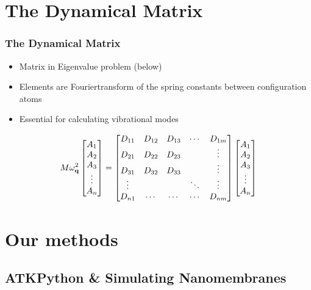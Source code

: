 \documentclass[hyperref={colorlinks=true,urlcolor=blue,linkcolor=.},aspectratio=1610,mathserif]{beamer}
\begin{document}
\section{The Dynamical Matrix}

\begin{frame}
 \frametitle{The Dynamical Matrix}
 \begin{itemize}[<+->]
  \pause
  \item Matrix in Eigenvalue problem (below)
  \item Elements are Fouriertransform of the spring constants between configuration atoms
  \item Essential for calculating vibrational modes
 \end{itemize}
 \begin{equation}
  M\omega_{\mathbf{q}}^{2}
  \begin{bmatrix}
   A_{1}  \\
   A_{2}  \\
   A_{3}  \\
   \vdots \\
   A_{n}
  \end{bmatrix}
  =
  \begin{bmatrix}
   D_{11} & D_{12} & D_{13} & \cdots                 & D_{1m} \\
   D_{21} & D_{22} & D_{23} &                        & \vdots \\
   D_{31} & D_{32} & D_{33} &                        & \vdots \\
   \vdots &        &        & \reflectbox{$\iddots$} & \vdots \\
   D_{n1} & \cdots & \cdots & \cdots                 & D_{nm}
  \end{bmatrix}\begin{bmatrix}
   A_{1}  \\
   A_{2}  \\
   A_{3}  \\
   \vdots \\
   A_{n}
  \end{bmatrix} \nonumber
 \end{equation}
\end{frame}

\section{Our methods}

\subsection{ATKPython \& Simulating Nanomembranes}
\end{document}
